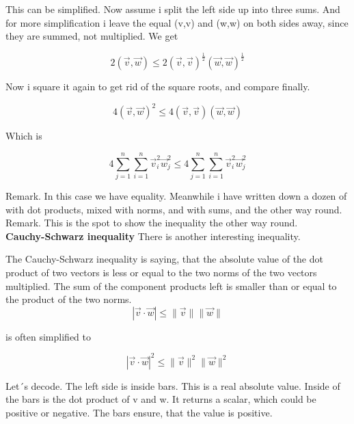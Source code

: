 \documentclass[a4paper]{article}
\begin{document}
This can be simplified. Now assume i split the left side up into three sums. And for more simplification i leave the equal (v,v) and (w,w) on both sides away, since they are summed, not multiplied. We get

\begin{displaymath}
2(\vec{v},\vec{w}) \leq 2(\vec{v},\vec{v})^{\frac{1}{2}}(\vec{w},\vec{w})^{\frac{1}{2}}
\end{displaymath}

Now i square it again to get rid of the square roots, and compare finally.

\begin{displaymath}
4(\vec{v}, \vec{w})^{2} \leq 4(\vec{v},\vec{v})(\vec{w},\vec{w}) 
\end{displaymath}

Which is 

\begin{displaymath}
4\sum_{j=1}^{n}\sum_{i=1}^{n}\vec{v}_{i}^{2}\vec{w}_{j}^{2} \leq 4\sum_{j=1}^{n}\sum_{i=1}^{n}\vec{v}_{i}^{2}\vec{w}_{j}^{2}
\end{displaymath}

Remark. In this case we have equality. Meanwhile i have written down a dozen of with dot products, mixed with norms, and with sums, and the other way round. \\


Remark. This is the spot to show the inequality the other way round.\\




\textbf{Cauchy-Schwarz inequality} There is another interesting inequality.

The Cauchy-Schwarz inequality is saying, that the absolute value of the dot product of two vectors is less or equal to the two norms of the two vectors multiplied. The sum of the component products left is smaller than or equal to the product of the two norms.\\

\begin{displaymath}
    |\vec{v}\cdot\vec{w}| \leq \|\vec{v}\|\|\vec{w}\|
\end{displaymath}

is often simplified to

\begin{displaymath}
    |\vec{v}\cdot\vec{w}|^{2} \leq \|\vec{v}\|^{2}\|\vec{w}\|^{2}
\end{displaymath}

Let´s decode. The left side is inside bars. This is a real absolute value. Inside of the bars is the dot product of v and w. It returns a scalar, which could be positive or negative. The bars ensure, that the value is positive.\\
\end{document}
